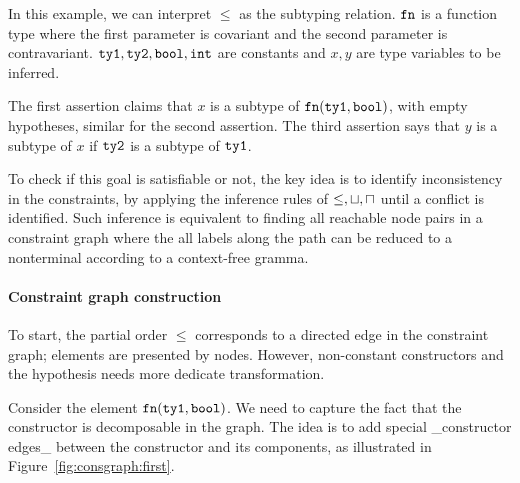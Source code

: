 In this example, we can interpret $\leq$ as the subtyping relation. $\mathtt{fn}$ is
a function type where the first parameter is covariant and the second
parameter is contravariant. $\mathtt{ty1}, \mathtt{ty2}, \mathtt{bool},
\mathtt{int}$ are constants and $x,y$ are type variables to be inferred.

The first assertion claims that $x$ is a subtype of $\mathtt{fn} (\mathtt{ty1},
\mathtt{bool})$, with empty hypotheses, similar for the second assertion.
The third assertion says that $y$ is a subtype of $x$ if $\mathtt{ty2}$ is
a subtype of $\mathtt{ty1}$.

To check if this goal is satisfiable or not, the key idea is to
identify inconsistency in the constraints, by applying the inference
rules of $\leq, \sqcup, \sqcap$ until a conflict is identified. Such
inference is equivalent to finding all reachable node pairs in a
constraint graph where the all labels along the path can be reduced to
a nonterminal according to a context-free gramma.

\paragraph{Constraint graph construction}
To start, the partial order $\leq$ corresponds to a directed edge in
the constraint graph; elements are presented by nodes. However,
non-constant constructors and the hypothesis needs more dedicate
transformation.

Consider the element $\mathtt{fn} (\mathtt{ty1}, \mathtt{bool})$. We need to capture
the fact that the constructor is decomposable in the graph. The idea is to add
special _constructor edges_ between the constructor and its
components, as illustrated in Figure~\ref{fig:consgraph:first}.

